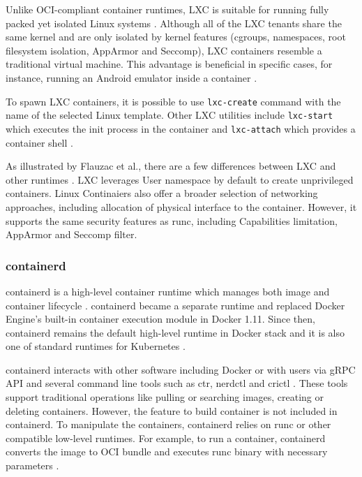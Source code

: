 Unlike OCI-compliant container runtimes, LXC is suitable for running fully packed yet isolated Linux systems \cite{b:lxc}. Although all of the LXC tenants share the same kernel and are only isolated by kernel features (cgroups, namespaces, root filesystem isolation, AppArmor and Seccomp), LXC containers resemble a traditional virtual machine. This advantage is beneficial in specific cases, for instance, running an Android emulator inside a container \cite{c:8}.

To spawn LXC containers, it is possible to use \texttt{lxc-create} command with the name of the selected Linux template. Other LXC utilities include \texttt{lxc-start} which executes the init process in the container and \texttt{lxc-attach} which provides a container shell \cite{m:lxc}.

As illustrated by Flauzac et al., there are a few differences between LXC and other runtimes \cite{pcs:1}. LXC leverages User namespace by default to create unprivileged containers. Linux Continaiers also offer a broader selection of networking approaches, including allocation of physical interface to the container. However, it supports the same security features as runc, including Capabilities limitation, AppArmor and Seccomp filter.

\subsubsection*{containerd}

containerd is a high-level container runtime which manages both image and container lifecycle \cite{b:ianlewis3}. containerd became a separate runtime and replaced Docker Engine's built-in container execution module in Docker 1.11. Since then, containerd remains the default high-level runtime in Docker stack and it is also one of standard runtimes for Kubernetes \cite{book:kube}.

containerd interacts with other software including Docker or with users via gRPC API and several command line tools such as ctr, nerdctl and crictl \cite{d:getting-started}. These tools support traditional operations like pulling or searching images, creating or deleting containers. However, the feature to build container is not included in containerd. To manipulate the containers, containerd relies on runc or other compatible low-level runtimes. For example, to run a container, containerd converts the image to OCI bundle and executes runc binary with necessary parameters \cite{c:4}.

